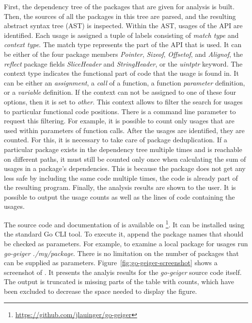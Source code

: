 First, the dependency tree of the packages that are given for analysis is built.
Then, the sources of all the packages in this tree are parsed, and the resulting abstract syntax tree (\acrshort{AST})
is inspected.
Within the \acrshort{AST}, usages of the \unsafe{} \acrshort{API} are identified.
Each usage is assigned a tuple of labels consisting of \textit{match type} and \textit{context type}.
The match type represents the part of the \unsafe{} \acrshort{API} that is used.
It can be either of the four \unsafe{} package members \textit{Pointer}, \textit{Sizeof}, \textit{Offsetof}, and
\textit{Alignof}, the \textit{reflect} package fields \textit{SliceHeader} and \textit{StringHeader}, or the
\textit{uintptr} keyword.
The context type indicates the functional part of code that the usage is found in.
It can be either an \textit{assignment}, a \textit{call} of a function, a function \textit{parameter} definition, or a
\textit{variable} definition.
If the context can not be assigned to one of these four options, then it is set to \textit{other}.
This context allows to filter the search for \unsafe{} usages to particular functional code positions.
There is a \toolGeiger{} command line parameter to request this filtering.
For example, it is possible to count only \unsafe{} usages that are used within parameters of function calls.
After the \unsafe{} usages are identified, they are counted.
For this, it is necessary to take care of package deduplication.
If a particular package exists in the dependency tree multiple times and is reachable on different paths, it must still
be counted only once when calculating the sum of \unsafe{} usages in a package's dependencies.
This is because the package does not get any less safe by including the same code multiple times, the code is already
part of the resulting program.
Finally, the analysis results are shown to the user.
It is possible to output the \unsafe{} usage counts as well as the lines of code containing the usages.

The source code and documentation of \toolGeiger{} is available on
\github{}\footnote{\url{https://github.com/jlauinger/go-geiger}}.
It can be installed using the standard Go \acrshort{CLI} tool.
To execute it, append the package names that should be checked as parameters.
For example, to examine a local package for \unsafe{} usages run \textit{go-geiger ./my/package}.
There is no limitation on the number of packages that can be supplied as parameters.
Figure~\ref{fig:go-geiger-screenshot} shows a screenshot of \toolGeiger{}.
It presents the analyis results for the \textit{go-geiger} source code itself.
The output is truncated is missing parts of the table with \unsafe{} counts, which have been excluded to decrease the
space needed to display the figure.

